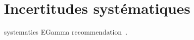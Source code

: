 \section{Incertitudes systématiques}\label{chapter-HTT_analysis-section-systematics}

systematics EGamma recommendation~\cite{EGammaRunII}.



